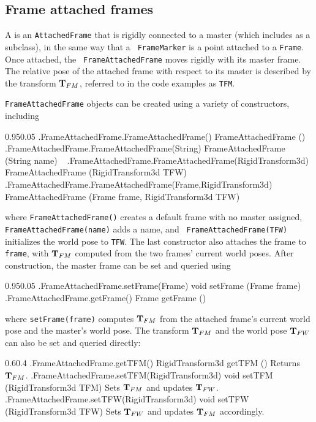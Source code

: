 \subsection{Frame attached frames}
\label{frameAttachedFrames:sec}

A  is an {\tt AttachedFrame} that is
rigidly connected to a master  (which includes
 as a subclass), in the same way that a {\tt
FrameMarker} is a point attached to a {\tt Frame}. Once attached, the {\tt
FrameAttachedFrame} moves rigidly with its master frame. The relative pose of
the attached frame with respect to its master is described by the transform
${\bf T}_{FM}$, referred to in the code examples as {\tt TFM}.

{\tt FrameAttachedFrame} objects can be created using a variety of
constructors, including
\begin{methodtable}{0.95}{0.05}
\midline
%
\methodentry
{\mech.FrameAttachedFrame.FrameAttachedFrame()}%
{FrameAttachedFrame ()}%
{\ }%
%
\methodentry
{\mech.FrameAttachedFrame.FrameAttachedFrame(String)}%
{FrameAttachedFrame (String name)}%
{\ }%
%
\methodentry
{\mech.FrameAttachedFrame.FrameAttachedFrame(RigidTransform3d)}%
{FrameAttachedFrame (RigidTransform3d TFW)}%
{\ }%
%
\methodentry
{\mech.FrameAttachedFrame.FrameAttachedFrame(Frame,RigidTransform3d)}%
{FrameAttachedFrame (Frame frame, RigidTransform3d TFW)}%
{\ }%
%
\midline
\end{methodtable}
%
where {\tt FrameAttachedFrame()} creates a default frame with no master
assigned, {\tt FrameAttachedFrame(name)} adds a name, and {\tt
FrameAttachedFrame(TFW)} initializes the world pose to {\tt TFW}. The
last constructor also attaches the frame to {\tt frame}, with ${\bf T}_{FM}$
computed from the two frames' current world poses. After construction,
the master frame can be set and queried using
\begin{methodtable}{0.95}{0.05}
\midline
%
\methodentry
{\mech.FrameAttachedFrame.setFrame(Frame)}%
{void setFrame (Frame frame)}%
{\ }%
%
\methodentry
{\mech.FrameAttachedFrame.getFrame()}%
{Frame getFrame ()}%
{\ }%
%
\midline
\end{methodtable}
%
where {\tt setFrame(frame)} computes ${\bf T}_{FM}$ from the attached frame's
current world pose and the master's world pose. The transform ${\bf T}_{FM}$ and
the world pose ${\bf T}_{FW}$ can also be set and queried directly:
\begin{methodtable}{0.6}{0.4}
\midline
%
\methodentry
{\mech.FrameAttachedFrame.getTFM()}%
{RigidTransform3d getTFM ()}%
{Returns ${\bf T}_{FM}$.}%
%
\methodentry
{\mech.FrameAttachedFrame.setTFM(RigidTransform3d)}%
{void setTFM (RigidTransform3d TFM)}%
{Sets ${\bf T}_{FM}$ and updates ${\bf T}_{FW}$.}%
%
\methodentry
{\mech.FrameAttachedFrame.setTFW(RigidTransform3d)}%
{void setTFW (RigidTransform3d TFW)}%
{Sets ${\bf T}_{FW}$ and updates ${\bf T}_{FM}$ accordingly.}%
%
\midline
\end{methodtable}
